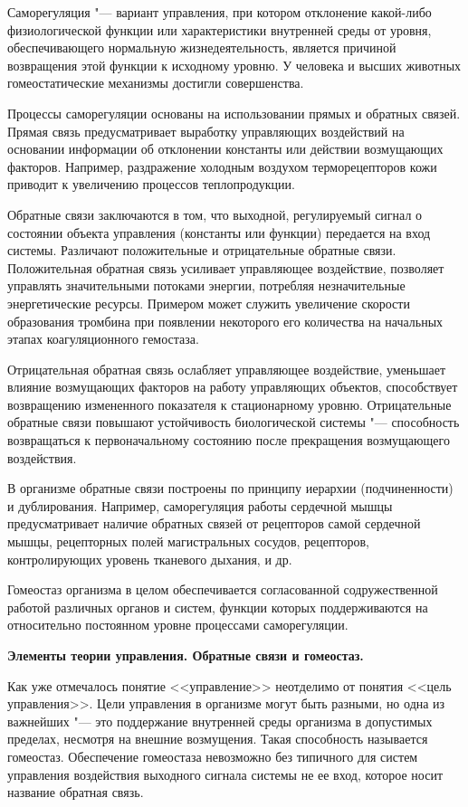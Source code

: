 \documentclass[12pt,a4paper,oneside]{book}
\begin{document}
Саморегуляция "--- вариант управления, при котором отклонение какой-либо физиологической функции или характеристики внутренней среды от уровня, обеспечивающего нормальную жизнедеятельность, является причиной возвращения этой функции к исходному уровню. У человека и высших животных гомеостатические механизмы достигли совершенства.

Процессы саморегуляции основаны на использовании прямых и обратных связей. Прямая связь предусматривает выработку управляющих воздействий на основании информации об отклонении константы или действии возмущающих факторов. Например, раздражение холодным воздухом терморецепторов кожи приводит к увеличению процессов теплопродукции.

Обратные связи заключаются в том, что выходной, регулируемый сигнал о состоянии объекта управления (константы или функции) передается на вход системы. Различают положительные и отрицательные обратные связи. Положительная обратная связь усиливает управляющее воздействие, позволяет управлять значительными потоками энергии, потребляя незначительные энергетические ресурсы. Примером может служить увеличение скорости образования тромбина при появлении некоторого его количества на начальных этапах коагуляционного гемостаза.

Отрицательная обратная связь ослабляет управляющее воздействие, уменьшает влияние возмущающих факторов на работу управляющих объектов, способствует возвращению измененного показателя к стационарному уровню. Отрицательные обратные связи повышают устойчивость биологической системы "--- способность возвращаться к первоначальному состоянию после прекращения возмущающего воздействия.

В организме обратные связи построены по принципу иерархии (подчиненности) и дублирования. Например, саморегуляция работы сердечной мышцы предусматривает наличие обратных связей от рецепторов самой сердечной мышцы, рецепторных полей магистральных сосудов, рецепторов, контролирующих уровень тканевого дыхания, и др.

Гомеостаз организма в целом обеспечивается согласованной содружественной работой различных органов и систем, функции которых поддерживаются на относительно постоянном уровне процессами саморегуляции.

\begin{center}
{\bf Элементы теории управления. Обратные связи и гомеостаз.}
\end{center}

Как уже отмечалось понятие <<управление>> неотделимо от понятия <<цель управления>>. Цели управления в организме могут быть разными, но одна из важнейших "--- это поддержание внутренней среды организма в допустимых пределах, несмотря на внешние возмущения. Такая способность называется гомеостаз. Обеспечение гомеостаза невозможно без типичного для систем управления воздействия выходного сигнала системы не ее вход, которое носит название обратная связь. 
\end{document}
